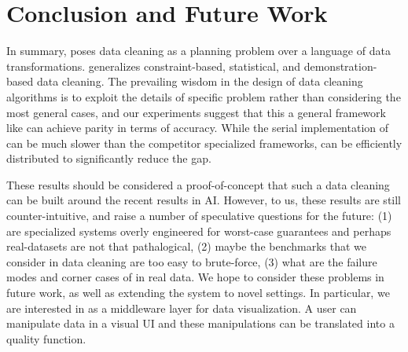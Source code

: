 \section{Conclusion and Future Work}
In summary, \sys poses data cleaning as a planning problem over a language of data transformations.
\sys generalizes constraint-based, statistical, and demonstration-based data cleaning.
The prevailing wisdom in the design of data cleaning algorithms is to exploit the details of specific problem rather than considering the most general cases, and our experiments suggest that this a general framework like \sys can achieve parity in terms of accuracy.
While the serial implementation of \sys can be much slower than the competitor specialized frameworks, \sys can be efficiently distributed to significantly reduce the gap.

These results should be considered a proof-of-concept that such a data cleaning \sys can be built around the recent results in AI. 
However, to us, these results are still counter-intuitive, and raise a number of speculative questions for the future: (1) are specialized systems overly engineered for worst-case guarantees and perhaps real-datasets are not that pathalogical, (2) maybe the benchmarks that we consider in data cleaning are too easy to brute-force, (3) what are the failure modes and corner cases of \sys in real data.
We hope to consider these problems in future work, as well as extending the system to novel settings.
In particular, we are interested in \sys as a middleware layer for data visualization.
A user can manipulate data in a visual UI and these manipulations can be translated into a quality function.


